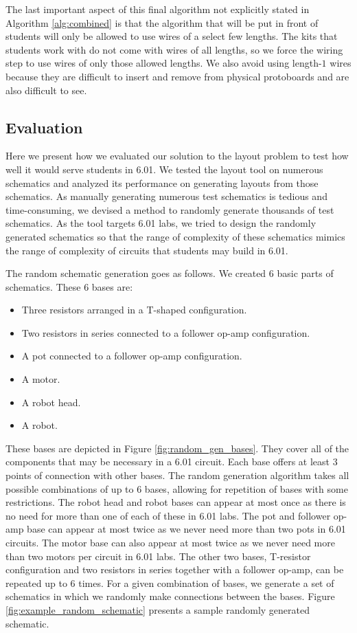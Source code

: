 The last important aspect of this final algorithm not explicitly stated in
Algorithm \ref{alg:combined} is that the algorithm that will be put
in front of students will only be allowed to use wires of a select few lengths.
The kits that students work with do not come with wires of all lengths,
so we force the wiring step to use wires of only those allowed lengths. We also
avoid using length-$1$ wires because they are difficult to insert and
remove from physical protoboards and are also difficult to see.

\subsection{Evaluation}

Here we present how we evaluated our solution to the layout problem
to test how well it would serve students in 6.01.
We tested the layout tool on numerous schematics and
analyzed its performance on generating layouts from those schematics.
As manually generating
numerous test schematics is tedious and time-consuming, we devised a method
to randomly generate thousands of test schematics. As the tool targets 6.01 labs,
we tried to design the randomly generated schematics so that the range of
complexity of these schematics mimics the range of complexity of circuits that
students may build in 6.01.

The random schematic generation goes as follows. We created $6$ basic parts
of schematics. These $6$ bases are:
\begin{itemize}
\item Three resistors arranged in a T-shaped configuration.
\item Two resistors in series connected to a follower op-amp configuration.
\item A pot connected to a follower op-amp configuration.
\item A motor.
\item A robot head.
\item A robot.
\end{itemize}
These bases are depicted in Figure
\ref{fig:random_gen_bases}. They cover all of the components that may be
necessary in a 6.01 circuit. Each base offers at least $3$ points of
connection with other bases. The random generation algorithm takes all
possible combinations of up to
$6$ bases, allowing for repetition of bases with some restrictions.
The robot head and robot bases can appear at most once as there is
no need for more than one of each of these in 6.01 labs. The pot and follower
op-amp base can appear at most twice as we never need more than two pots in 6.01
circuits. The motor base can also appear at most twice as we never need more
than two motors per circuit in 6.01 labs. The other two bases, T-resistor
configuration and two resistors in series together with a follower op-amp, can be
repeated up to 6 times. For a given combination of bases, we generate a
set of schematics in which we randomly make connections between the
bases. Figure \ref{fig:example_random_schematic} presents a sample randomly
generated schematic.

